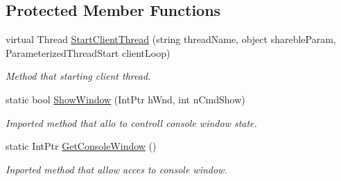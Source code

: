 \subsection*{Protected Member Functions}
\begin{DoxyCompactItemize}
\item 
virtual Thread \mbox{\hyperlink{class_uniform_client_1_1_base_client_a194b46bb0e889d07cade81c0aeab7cea}{Start\+Client\+Thread}} (string thread\+Name, object shareble\+Param, Parameterized\+Thread\+Start client\+Loop)
\begin{DoxyCompactList}\small\item\em Method that starting client thread. \end{DoxyCompactList}\item 
static bool \mbox{\hyperlink{class_uniform_client_1_1_base_client_a47b6d88848854c59fafefeeae3956699}{Show\+Window}} (Int\+Ptr h\+Wnd, int n\+Cmd\+Show)
\begin{DoxyCompactList}\small\item\em Imported method that allo to controll console window state. \end{DoxyCompactList}\item 
static Int\+Ptr \mbox{\hyperlink{class_uniform_client_1_1_base_client_aafcfed25b79baed0db4448f2e30f2aa2}{Get\+Console\+Window}} ()
\begin{DoxyCompactList}\small\item\em Inported method that allow acces to console window. \end{DoxyCompactList}\end{DoxyCompactItemize}
